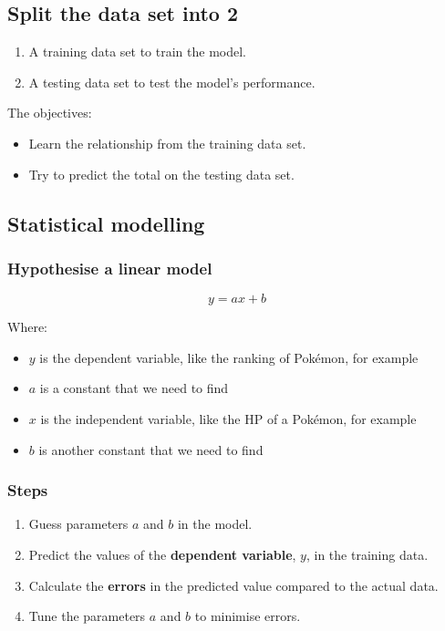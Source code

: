 \documentclass[11pt]{article}
\begin{document}
\subsection{Split the data set into 2}
\label{sec:org352264f}
\begin{enumerate}
\item A training data set to train the model.
\item A testing data set to test the model's performance.
\end{enumerate}

The objectives:
\begin{itemize}
\item Learn the relationship from the training data set.
\item Try to predict the total on the testing data set.
\end{itemize}
\subsection{Statistical modelling}
\label{sec:org2b55e3f}

\subsubsection{Hypothesise a linear model}
\label{sec:org3967752}
\[y = ax + b\]

Where:
\begin{itemize}
\item \(y\) is the dependent variable, like the ranking of Pokémon, for example
\item \(a\) is a constant that we need to find
\item \(x\) is the independent variable, like the HP of a Pokémon, for example
\item \(b\) is another constant that we need to find
\end{itemize}
\subsubsection{Steps}
\label{sec:org2e0512d}
\begin{enumerate}
\item Guess parameters \(a\) and \(b\) in the model.
\item Predict the values of the \textbf{dependent variable}, \(y\), in the training data.
\item Calculate the \textbf{errors} in the predicted value compared to the actual data.
\item Tune the parameters \(a\) and \(b\) to minimise errors.
\end{enumerate}
\end{document}
